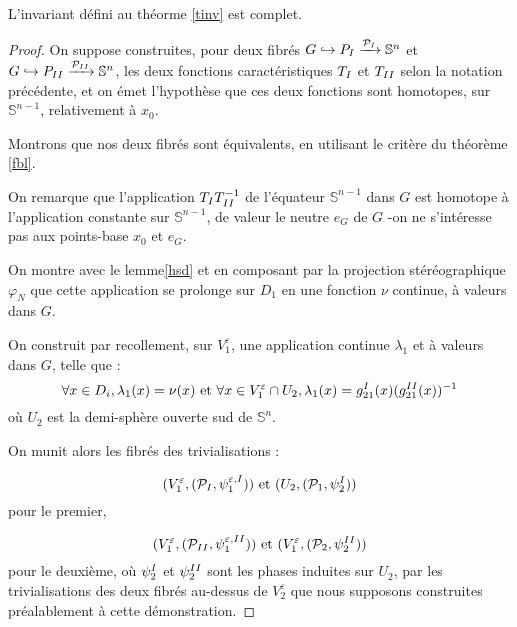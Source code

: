 \begin{theo}\label{tinvc}
L'invariant d\'efini au th\'eorme \ref{tinv} est complet.
\end{theo}

\begin{proof}
On suppose construites, pour deux fibrés $G \hookrightarrow P_{\Rom{1}} \xrightarrow{\mathcal{P}_{\Rom{1}}} \mathbb{S}^n$ %
et $G \hookrightarrow P_{\Rom{2}} \xrightarrow{\mathcal{P}_{\Rom{2}}} \mathbb{S}^n$, %
les deux fonctions caractéristiques $T_{\Rom{1}}$ et $T_{\Rom{2}}$ selon la notation précédente, %
et on émet l'hypothèse que ces deux fonctions sont homotopes, sur $\mathbb{S}^{n-1}$, relativement à $x_0$.

\par
Montrons que nos deux fibrés sont équivalents, en utilisant le critère du théorème \ref{fbl}.

\par
On remarque que l'application $T_{\Rom{1}} T_{\Rom{2}}^{-1}$ de l'équateur $\mathbb{S}^{n-1}$ dans $G$ est homotope à l'application constante sur $\mathbb{S}^{n-1}$, %
de valeur le neutre $e_G$ de $G$ -on ne s'intéresse pas aux points-base $x_0$ et $e_G$.

\par
On montre avec le lemme\ref{hsd} et en composant par la projection stéréographique $\varphi_N$ %
que cette application se prolonge sur $D_1$ en une fonction $\nu$ continue, à valeurs dans $G$.

\par
On construit par recollement, sur $V_1^{\varepsilon}$, une application continue $\lambda_1$ et à valeurs dans $G$, telle que :
\[\forall x \in D_i , \lambda_1(x) = \nu(x)\text{ et }\forall x \in V_1^{\varepsilon} \cap U_2 , \lambda_1 (x) = g^{\Rom{1}}_{21}(x) (g^{\Rom{2}}_{21}(x))^{-1}\]
où $U_2$ est la demi-sphère ouverte sud de $\mathbb{S}^n$.

On munit alors les fibrés des trivialisations :

\[(V_1^{\varepsilon},(\mathcal{P}_{\Rom{1}},\psi_1^{\varepsilon ,\Rom{1}}))\text{ et }(U_2,(\mathcal{P}_1,\psi_2^{\Rom{1}}))\]
pour le premier,

\[(V_1^{\varepsilon},(\mathcal{P}_{\Rom{2}},\psi_1^{\varepsilon ,\Rom{2}}))\text{ et }(V_1^{\varepsilon},(\mathcal{P}_2,\psi_2^{\Rom{2}}))\]
pour le deuxième, où $\psi_2^{\Rom{1}}$ et $\psi_2^{\Rom{2}}$ sont les phases induites sur $U_2$, %
par les trivialisations des deux fibrés au-dessus de $V_2^{\varepsilon}$ que nous supposons construites préalablement à cette démonstration.


\end{proof}
